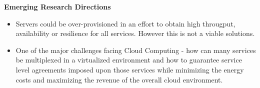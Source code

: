 \textbf{Emerging Research Directions}
\begin{itemize}
  \item Servers could be over-provisioned in an effort to obtain high througput, availability or resilience for all services. However this is not a viable solutions.
  \item One of the major challenges facing Cloud Computing - how can many services be multiplexed in a virtualized environment and how to guarantee service level agreements imposed upon those services while minimizing the energy costs and maximizing the revenue of the overall cloud environment.
\end{itemize}



